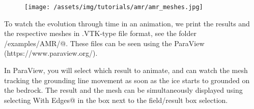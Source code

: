 \begin{figure}[H]
	\begin{center}
		\texttt{[image: /assets/img/tutorials/amr/amr\_meshes.jpg]}
	\end{center}
\end{figure}

To watch the evolution through time in an animation, we print the results and the respective meshes in .VTK-type file format, see the folder \verb@trunk/examples/AMR/@. These files can be seen using the ParaView (https://www.paraview.org/).

In ParaView, you will select which result to animate, and can watch the mesh tracking the grounding line movement as soon as the ice starts to grounded on the bedrock. The result and the mesh can be simultaneously displayed using selecting \verb@Surface With Edges@ in the box next to the field/result box selection.
